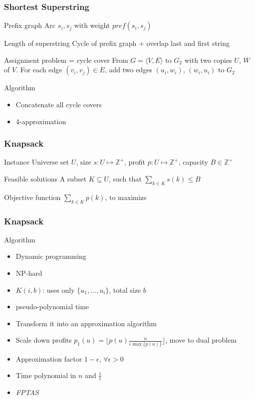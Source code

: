 \documentclass[12pt,aspectratio=169]{beamer}
\begin{document}
  \begin{frame}\frametitle{Shortest Superstring }
  \begin{block}{Prefix graph}
      Arc $s_{i}, s_{j}$ with weight $pref(s_{i}, s_{j})$
  \end{block}
  \begin{block}{Length of superstring}
    Cycle of prefix graph + overlap last and first string
%
  \end{block}
  \begin{block}{Assignment problem = cycle cover}
    From $G=\langle V, E\rangle$ to $G_{2}$ with two copies $U$, $W$ of $V$.
%
    For each edge $(v_{i}, v_{j})\in E$, add two edges $(u_{i}, w_{i})$, $(w_{i}, u_{i})$
    to $G_{2}$
  \end{block}
  \begin{block}{Algorithm}
    \begin{itemize}
    \item
      Concatenate all cycle covers
    \item
      4-approximation
    \end{itemize}
  \end{block}
\end{frame} 


\begin{frame}\frametitle{Knapsack }
  \begin{block}{Instance}
    Universe set $U$, size $s: U \mapsto \mathbb{Z}^{+}$, profit $p: U \mapsto
    \mathbb{Z}^{+}$, capacity $B\in \mathbb{Z}^{+}$
%
  \end{block}
  \begin{block}{Feasible solutions}
    A subset $K\subseteq U$, such that $\sum_{k\in K}s(k) \le B$
  \end{block}
  \begin{block}{Objective function}
    $\sum_{k\in K} p(k)$, to maximize
  \end{block}
\end{frame}


\begin{frame}\frametitle{Knapsack }
  \begin{block}{Algorithm}
    \begin{itemize}[<.->]
    \item
      Dynamic programming
    \item
      NP-hard
    \item
      $K(i,b)$: uses only $\{u_{1}, \ldots, u_{i}\}$, total size $b$
    \item
      pseudo-polynomial time
    \item
      Transform it into an approximation algorithm
    \item
      Scale down profits $p_{1}(u) = \lfloor p(u) \frac{n}{\epsilon \max\{p(u)\}} \rfloor$, move to dual problem
    \item
      Approximation factor $1-\epsilon$, $\forall \epsilon>0$
    \item
      Time polynomial in $n$ and $\frac{1}{\epsilon}$
    \item
      \emph{FPTAS}
    \end{itemize}
  \end{block}
\end{frame} 
\end{document}
